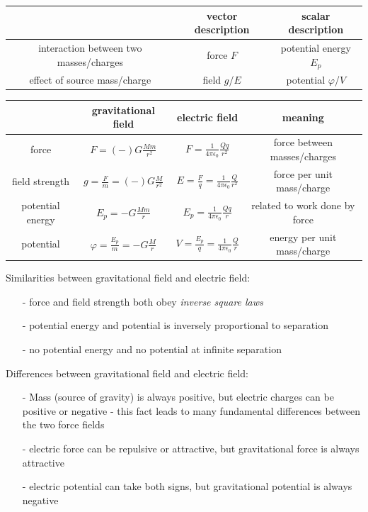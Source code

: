 \begin{center}
	\begin{tabular}{|c|c|c|}
		\hline
		& vector description & scalar description \\ \hline 
		interaction between two masses/charges & force $F$ & potential energy $E_p$ \\ \hline
		effect of source mass/charge & field $g$/$E$ & potential $\varphi$/$V$ \\ \hline
	\end{tabular}
\end{center}

\begin{center}
{\renewcommand{\arraystretch}{1.28}
\begin{tabular}{|c|c|c|c|}
\hline
& gravitational field & electric field & meaning \\ \hline 
force & $F=(-)G \frac{Mm}{r^2}$ & $F=\frac{1}{4\pi\epsilon_0} \frac{Qq}{r^2}$ & force between masses/charges\\ [1ex] \hline
field strength & $g= \frac{F}{m} = (-)G \frac{M}{r^2}$ & $E= \frac{F}{q} = \frac{1}{4\pi\epsilon_0} \frac{Q}{r^2}$ & force per unit mass/charge\\ [1ex] \hline
potential energy &  $E_p = -G \frac{Mm}{r}$ & $E_p=\frac{1}{4\pi\epsilon_0} \frac{Qq}{r}$ & related to work done by force \\ [1ex] \hline
potential & $\varphi = \frac{E_p}{m} = -G \frac{M}{r}$ & $V = \frac{E_p}{q} = \frac{1}{4\pi\epsilon_0} \frac{Q}{r}$ & energy per unit mass/charge\\ [1ex] \hline
\end{tabular}}
\end{center}

Similarities between gravitational field and electric field:

\begin{itemize}
	\item[-] force and field strength both obey \emph{inverse square laws}
	
	\item[-] potential energy and potential is inversely proportional to separation
	
	\item[-] no potential energy and no potential at infinite separation
\end{itemize}

Differences between gravitational field and electric field:

\begin{itemize}

\item[-] Mass (source of gravity) is always positive, but electric charges can be positive or negative - this fact leads to many fundamental differences between the two force fields
\item[-] electric force can be repulsive or attractive, but gravitational force is always attractive

\item[-] electric potential can take both signs, but gravitational potential is always negative
\end{itemize}

